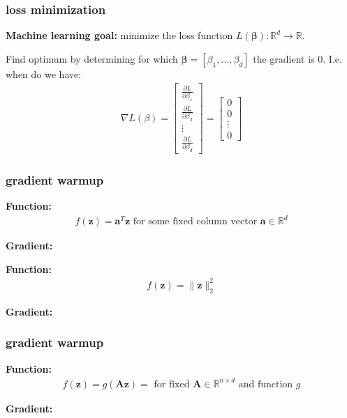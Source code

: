 \documentclass[handout,compress]{beamer}
\newcommand{\bs}[1]{\boldsymbol{#1}}
\newcommand{\bv}[1]{\mathbf{#1}}
\newcommand{\R}{\mathbb{R}}
\begin{document}
\begin{frame}
	\frametitle{loss minimization}
	\textbf{Machine learning goal:} minimize the loss function $L(\bs{\beta}): \R^{d} \rightarrow \R$.
	
	\vspace{1em}
	Find optimum by determining for which $\bs{\beta} = [\beta_1, \ldots, \beta_d]$ the gradient is $0$. I.e. when do we have:
		\begin{align*}
		\nabla L(\beta) = \begin{bmatrix}
		 \frac{\partial L}{\partial \beta_1} \\ \frac{\partial L}{\partial \beta_2} \\ \vdots \\ \frac{\partial L}{\partial \beta_d}
		\end{bmatrix} = 
		\begin{bmatrix}
		0 \\ 0 \\ \vdots \\ 0
		\end{bmatrix} 
		\end{align*}
\end{frame}


\begin{frame}[t]
	\frametitle{gradient warmup}
	\textbf{Function:}
	\begin{align*}
	f(\bv{z}) = \bv{a}^T\bv{z} \text{ for some fixed column vector } \bv{a} \in \R^d
	\end{align*}
	
	\textbf{Gradient:}	\vspace{3em}
	
	\textbf{Function:}
	\begin{align*}
	f(\bv{z}) = \|\bv{z}\|_2^2
	\end{align*}
	
	\textbf{Gradient:}
	
\end{frame}

\begin{frame}[t]
	\frametitle{gradient warmup}
	\textbf{Function:}
	\begin{align*}
	f(\bv{z}) = g(\bv{A}\bv{z})= \text{ for fixed } \bv{A} \in \R^{n\times d} \text{ and function } g
	\end{align*}
	
	\textbf{Gradient:}	\vspace{3em}
	
	
\end{frame}
\end{document}
